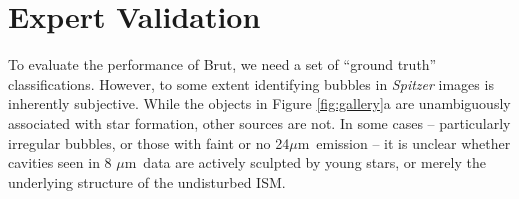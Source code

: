 \documentclass[preprint]{aastex}
\newcommand{\todo}[1]{{\color[rgb]{0, .5, .5} TODO: #1}}
\newcommand{\um}[0]{$\mu$m}
\begin{document}
\begin{comment}
These numbers allow us to estimate the reliability and completeness of both catalogs. Assuming that there are no other bubbles in this region with $r > s_{\rm min}$ missed by both classifiers (but still detectable from the image data), there are roughly 24 detectable bubbles in this region -- 13 bubbles present in both catalogs, 5 objects only in the MWP catalog, 2 objects only in the automated catalog, and $\sim$ 4 bubbles in bubble complexes. The automated catalog recovers 80\% (19/24) of the bubbles, and mis-classifies 24\% (6/25) of detections. The Milky Way Project performs similarly: it recovers 92\% of bubbles (22/24), and mis-classifies 23\% of its detections (7/31).

\subsubsection{Searching for small bubbles}
In the previous analysis, three bubbles in the MWP catalog were not included in the automated catalog because they were smaller than the smallest scales scanned over.  These objects would otherwise have been included -- that is, the classifier assigns each bubble a high score. We thus repeated the above analysis, with a lower value of $s_{\rm min}$. This smaller-scale scan recovers the three small bubbles missed by the first scan. In addition, it discovers 4 additional small bubbles not in the MWP catalog. \todo{Are these in the small object catalog?}. However, false positive rate is also higher -- at very small scales, the classifier more easily confuses bright 24 \um\, sources as bubble interiors, and find's more coincidental 8\um\, nebulosity that is vaguely ring-like. Overall, the false positive rate is 42\% when including a search for small bubbles, and detections not in the MWP catalog are 4 times more likely to be false positives than legitimate bubbles. From this, we conclude that our classifier is not currently suitable for searching for small bubbles.
\end{comment}

\section{Expert Validation}
\label{sec:expert}

To evaluate the performance of Brut, we need a set of ``ground truth'' classifications. However, to some extent identifying bubbles in \textit{Spitzer} images is inherently subjective. While the objects in Figure \ref{fig:gallery}a are unambiguously associated with star formation, other sources are not. In some cases -- particularly irregular bubbles, or those with faint or no 24\um\, emission -- it is unclear whether cavities seen in 8 \um\, data are actively sculpted by young stars, or merely the underlying structure of the undisturbed ISM. 
\end{document}
